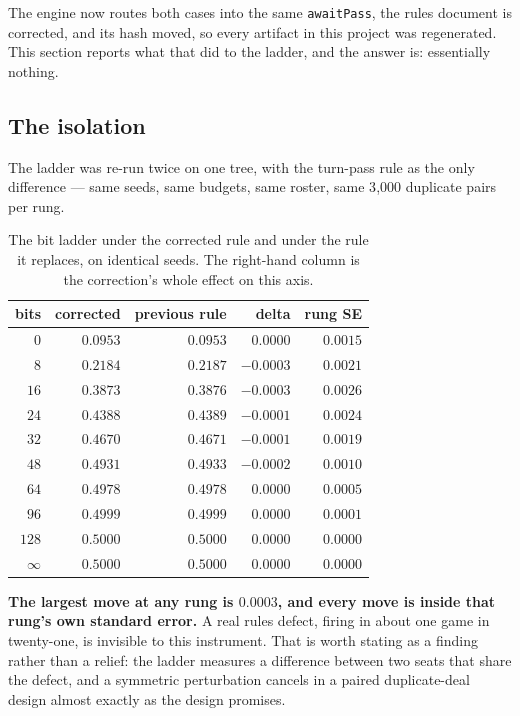 \documentclass[11pt]{article}
\newcommand{\code}[1]{\texttt{#1}}
\begin{document}
The engine now routes both cases into the same \code{awaitPass}, the rules document is corrected,
and its hash moved, so every artifact in this project was regenerated. This section reports what
that did to the ladder, and the answer is: essentially nothing.

\subsection{The isolation}

The ladder was re-run twice on one tree, with the turn-pass rule as the only difference --- same
seeds, same budgets, same roster, same 3{,}000 duplicate pairs per rung.

\begin{table}[t]
\centering
\caption{The bit ladder under the corrected rule and under the rule it replaces, on identical
seeds. The right-hand column is the correction's whole effect on this axis.}
\label{tab:addturnpass}
\footnotesize
\begin{tabular}{@{}rrrrr@{}}
\toprule
bits & corrected & previous rule & delta & rung SE \\
\midrule
$0$   & $0.0953$ & $0.0953$ & $0.0000$  & $0.0015$ \\
$8$   & $0.2184$ & $0.2187$ & $-0.0003$ & $0.0021$ \\
$16$  & $0.3873$ & $0.3876$ & $-0.0003$ & $0.0026$ \\
$24$  & $0.4388$ & $0.4389$ & $-0.0001$ & $0.0024$ \\
$32$  & $0.4670$ & $0.4671$ & $-0.0001$ & $0.0019$ \\
$48$  & $0.4931$ & $0.4933$ & $-0.0002$ & $0.0010$ \\
$64$  & $0.4978$ & $0.4978$ & $0.0000$  & $0.0005$ \\
$96$  & $0.4999$ & $0.4999$ & $0.0000$  & $0.0001$ \\
$128$ & $0.5000$ & $0.5000$ & $0.0000$  & $0.0000$ \\
$\infty$ & $0.5000$ & $0.5000$ & $0.0000$ & $0.0000$ \\
\bottomrule
\end{tabular}
\end{table}

\textbf{The largest move at any rung is $0.0003$, and every move is inside that rung's own standard
error.} A real rules defect, firing in about one game in twenty-one, is invisible to this
instrument. That is worth stating as a finding rather than a relief: the ladder measures a
difference between two seats that share the defect, and a symmetric perturbation cancels in a
paired duplicate-deal design almost exactly as the design promises.
\end{document}
